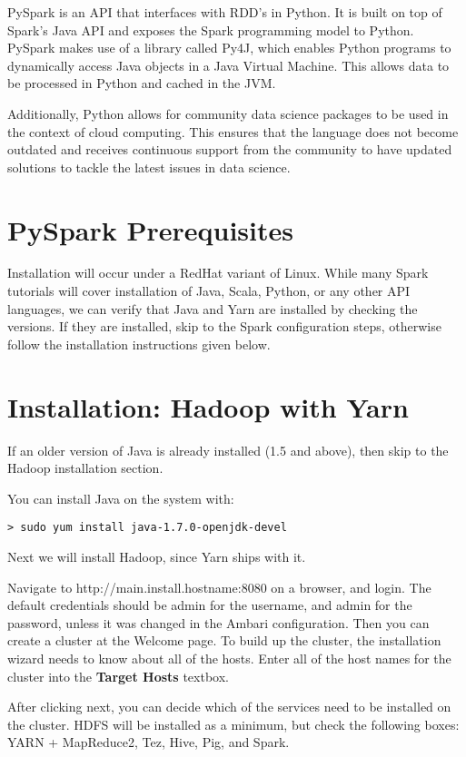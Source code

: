\documentclass[9pt,twocolumn,twoside]{idsi}
\begin{document}
PySpark is an API that interfaces with RDD's in Python. It is built on top of Spark's Java API and exposes the Spark programming model to Python. PySpark makes use of a library called Py4J, which enables Python programs to dynamically access Java objects in a Java Virtual Machine. This allows data to be processed in Python and cached in the JVM.

Additionally, Python allows for community data science packages to be used in the context of cloud computing. This ensures that the language does not become outdated and receives continuous support from the community to have updated solutions to tackle the latest issues in data science.

\section{PySpark Prerequisites}

Installation will occur under a RedHat variant of Linux. While many Spark tutorials will cover installation of Java, Scala, Python, or any other API languages, we can verify that Java and Yarn are installed by checking the versions. If they are installed, skip to the Spark configuration steps, otherwise follow the installation instructions given below.

\section{Installation: Hadoop with Yarn}
If an older version of Java is already installed (1.5 and above), then skip to the Hadoop installation section.

\noindent
You can install Java on the system with:
\begin{verbatim}
> sudo yum install java-1.7.0-openjdk-devel
\end{verbatim}

\noindent
Next we will install Hadoop, since Yarn ships with it. 

Navigate to http://{main.install.hostname}:8080 on a browser, and login. The default credentials should be admin for the username, and admin for the password, unless it was changed in the Ambari configuration.
Then you can create a cluster at the Welcome page. To build up the cluster, the installation wizard needs to know about all of the hosts. Enter all of the host names for the cluster into the \textbf{Target Hosts} textbox.

After clicking next, you can decide which of the services need to be installed on the cluster. HDFS will be installed as a minimum, but check the following boxes: YARN + MapReduce2, Tez, Hive, Pig, and Spark.
\end{document}
